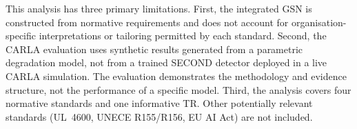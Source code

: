 This analysis has three primary limitations.
First, the integrated GSN is constructed from normative requirements and
does not account for organisation-specific interpretations or tailoring
permitted by each standard.
Second, the CARLA evaluation uses synthetic results generated from a
parametric degradation model, not from a trained SECOND detector deployed
in a live CARLA simulation. The evaluation demonstrates the methodology
and evidence structure, not the performance of a specific model.
Third, the analysis covers four normative standards and one informative
TR. Other potentially relevant standards (UL~4600, UNECE R155/R156,
EU AI Act) are not included.
